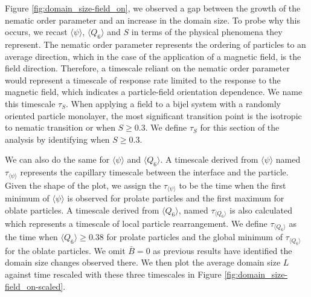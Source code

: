 Figure \ref{fig:domain_size-field_on}, we observed a gap between the
growth of the nematic order parameter and an increase in the domain
size. To probe why this occurs, we recast \(\langle \psi \rangle\),
\(\langle Q_6 \rangle\) and \(S\) in terms of the physical phenomena
they represent. The nematic order parameter represents the ordering of
particles to an average direction, which in the case of the application
of a magnetic field, is the field direction. Therefore, a timescale
reliant on the nematic order parameter would represent a timescale of
response rate limited to the response to the magnetic field, which
indicates a particle-field orientation dependence. We name this
timescale \(\tau_S\). When applying a field to a bijel system with a
randomly oriented particle monolayer, the most significant transition
point is the isotropic to nematic transition or when \(S \geq 0.3\). We
define \(\tau_S\) for this section of the analysis by identifying when
\(S \geq 0.3\).

We can also do the same for \(\langle \psi \rangle\) and
\(\langle Q_6 \rangle\). A timescale derived from
\(\langle \psi \rangle\) named \(\tau_{\langle \psi \rangle}\)
represents the capillary timescale between the interface and the
particle. Given the shape of the plot, we assign the
\(\tau_{\langle \psi \rangle}\) to be the time when the first minimum of
\(\langle \psi \rangle\) is observed for prolate particles and the first
maximum for oblate particles. A timescale derived from
\(\langle Q_6 \rangle\), named \(\tau_{\langle Q_6 \rangle}\) is also
calculated which represents a timescale of local particle rearrangement.
We define \(\tau_{\langle Q_6 \rangle}\) as the time when
\(\langle Q_6 \rangle \geq 0.38\) for prolate particles and the global
minimum of \(\tau_{\langle Q_6 \rangle}\) for the oblate particles. We
omit \(\bar{B} = 0\) as previous results have identified the domain size
changes observed there. We then plot the average domain size \(L\)
against time rescaled with these three timescales in Figure
\ref{fig:domain_size-field_on-scaled}.

